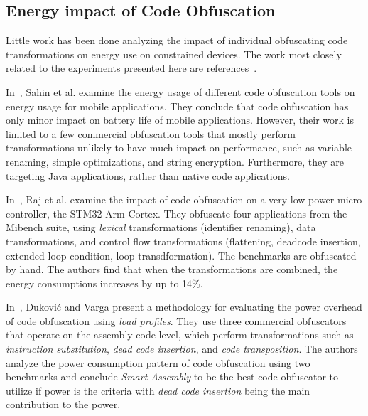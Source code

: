 \subsection{Energy impact of Code Obfuscation}

Little work has been done analyzing the impact of individual obfuscating code transformations on energy use on constrained devices. The work most closely related to the experiments presented here are references~\cite{6976079, dhukovic2015load, raj2017modelling}. 

In~\cite{6976079}, Sahin et al. examine the energy usage of different code obfuscation tools on energy usage for mobile applications. They conclude that code obfuscation has only minor impact on battery life of mobile applications. However, their work is limited to a few  commercial obfuscation tools that mostly perform transformations unlikely to have much impact on performance, such as variable renaming, simple optimizations, and string encryption. Furthermore, they are targeting Java applications, rather than native code applications.

In~\cite{raj2017modelling}, Raj et al. 
examine the impact of code obfuscation on a very low-power micro controller, the STM32 Arm Cortex. They obfuscate four applications from the Mibench suite, using {\em lexical} transformations (identifier renaming), data transformations, and control flow transformations (flattening, deadcode insertion, extended loop condition, loop transdformation). The benchmarks are obfuscated by hand. The authors find that when the transformations are combined, the energy consumptions increases by up to 14\%.

In~\cite{dhukovic2015load}, Dukovi\'{c} and Varga present a methodology for evaluating the power overhead of code obfuscation using {\em load profiles}.
They use three commercial obfuscators that operate on the assembly code level, which perform transformations such as {\em instruction substitution}, {\em dead code insertion}, and {\em code transposition}. The authors analyze the power consumption pattern of code obfuscation using two benchmarks and conclude {\em Smart Assembly} to be the best code obfuscator to utilize if power is the criteria with {\em dead code insertion} being the main contribution to the power.   

\endinput

rather than a taxonomy of obfuscation techniques, and ii) they do not analyze the detailed impact of a suite of available code obfuscation techniques ~\cite{tigress} to suggest particular obfuscation techniques that can be utilized for resource-constrained devices. 
In this paper, we fill this gap by analyzing the energy impact of various obfuscation techniques in order to suggest the use of specific obfuscation techniques provided a given energy constraint.  
